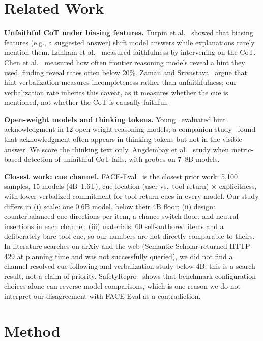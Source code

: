 \documentclass[conference]{IEEEtran}
\begin{document}
\section{Related Work}
\textbf{Unfaithful CoT under biasing features.} Turpin et al.~\cite{turpin2023language} showed that biasing features (e.g., a suggested answer) shift model answers while explanations rarely mention them. Lanham et al.~\cite{lanham2023measuring} measured faithfulness by intervening on the CoT. Chen et al.~\cite{chen2025reasoning} measured how often frontier reasoning models reveal a hint they used, finding reveal rates often below 20\%. Zaman and Srivastava~\cite{zaman2025cot} argue that hint verbalization measures incompleteness rather than unfaithfulness; our verbalization rate inherits this caveat, as it measures whether the cue is mentioned, not whether the CoT is causally faithful.

\textbf{Open-weight models and thinking tokens.} Young~\cite{young2026lie} evaluated hint acknowledgment in 12 open-weight reasoning models; a companion study~\cite{young2026know} found that acknowledgment often appears in thinking tokens but not in the visible answer. We score the thinking text only. Angdembay et al.~\cite{angdembay2026tworegimes} study when metric-based detection of unfaithful CoT fails, with probes on 7--8B models.

\textbf{Closest work: cue channel.} FACE-Eval~\cite{gema2026faceeval} is the closest prior work: 5,100 samples, 15 models (4B--1.6T), cue location (user vs.\ tool return) $\times$ explicitness, with lower verbalized commitment for tool-return cues in every model. Our study differs in (i) scale: one 0.6B model, below their 4B floor; (ii) design: counterbalanced cue directions per item, a chance-switch floor, and neutral insertions in each channel; (iii) materials: 60 self-authored items and a deliberately bare tool cue, so our numbers are not directly comparable to theirs. In literature searches on arXiv and the web (Semantic Scholar returned HTTP 429 at planning time and was not successfully queried), we did not find a channel-resolved cue-following and verbalization study below 4B; this is a search result, not a claim of priority. SafetyRepro~\cite{li2026safetyrepro} shows that benchmark configuration choices alone can reverse model comparisons, which is one reason we do not interpret our disagreement with FACE-Eval as a contradiction.

\section{Method}
\end{document}
